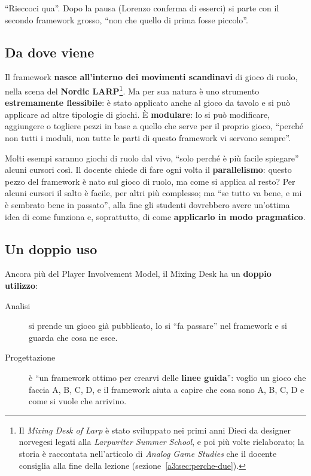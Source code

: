 ``Rieccoci qua''. Dopo la pausa (Lorenzo conferma di esserci) si parte con il
secondo framework grosso, ``non che quello di prima fosse piccolo''.

\subsection{Da dove viene}

Il framework \textbf{nasce all'interno dei movimenti scandinavi} di gioco di
ruolo, nella scena del \textbf{Nordic LARP}\footnote{Il \emph{Mixing Desk of
Larp} è stato sviluppato nei primi anni Dieci da designer norvegesi legati alla
\emph{Larpwriter Summer School}, e poi più volte rielaborato; la storia è
raccontata nell'articolo di \emph{Analog Game Studies} che il docente consiglia
alla fine della lezione (sezione~\ref{a3:sec:perche-due}).}. Ma per sua natura
è uno strumento \textbf{estremamente flessibile}: è stato applicato anche al
gioco da tavolo e si può applicare ad altre tipologie di giochi. È
\textbf{modulare}: lo si può modificare, aggiungere o togliere pezzi in base a
quello che serve per il proprio gioco, ``perché non tutti i moduli, non tutte le
parti di questo framework vi servono sempre''.

Molti esempi saranno giochi di ruolo dal vivo, ``solo perché è più facile
spiegare'' alcuni cursori così. Il docente chiede di fare ogni volta il
\textbf{parallelismo}: questo pezzo del framework è nato sul gioco di ruolo, ma
come si applica al resto? Per alcuni cursori il salto è facile, per altri più
complesso; ma ``se tutto va bene, e mi è sembrato bene in passato'', alla fine
gli studenti dovrebbero avere un'ottima idea di come funziona e, soprattutto, di
come \textbf{applicarlo in modo pragmatico}.

\subsection{Un doppio uso}

Ancora più del Player Involvement Model, il Mixing Desk ha un \textbf{doppio
utilizzo}:
\begin{description}
  \item[Analisi] si prende un gioco già pubblicato, lo si ``fa passare'' nel
        framework e si guarda che cosa ne esce.
  \item[Progettazione] è ``un framework ottimo per crearvi delle
        \textbf{linee guida}'': voglio un gioco che faccia A, B, C, D, e il
        framework aiuta a capire che cosa sono A, B, C, D e come si vuole che
        arrivino.
\end{description}

